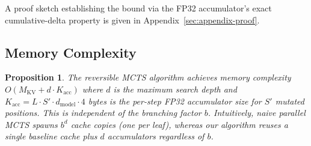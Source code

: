 \documentclass{article}
\newtheorem{proposition}{Proposition}
\begin{document}
A proof sketch establishing the bound via the FP32 accumulator's exact cumulative-delta property is given in Appendix~\ref{sec:appendix-proof}.

\subsection{Memory Complexity}

\begin{proposition}
\label{prop:memory}
The reversible MCTS algorithm achieves memory complexity $O(M_{\text{KV}} + d \cdot K_{\text{acc}})$ where $d$ is the maximum search depth and $K_{\text{acc}} = L \cdot S' \cdot d_{\text{model}} \cdot 4$ bytes is the per-step FP32 accumulator size for $S'$ mutated positions. This is independent of the branching factor $b$. Intuitively, naive parallel MCTS spawns $b^d$ cache copies (one per leaf), whereas our algorithm reuses a single baseline cache plus $d$ accumulators regardless of $b$.
\end{proposition}
\end{document}
